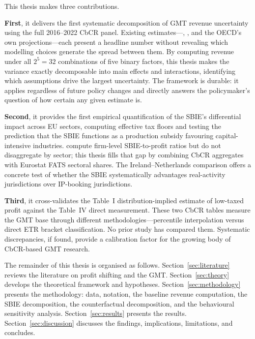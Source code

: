 \documentclass[11pt,a4paper]{article}
\begin{document}
This thesis makes three contributions.

\textbf{First}, it delivers the first systematic decomposition of GMT revenue uncertainty using the full 2016--2022 CbCR panel. Existing estimates---\citet{barake2022}, \citet{hugger2026}, and the OECD's own projections---each present a headline number without revealing which modelling choices generate the spread between them. By computing revenue under all $2^5 = 32$ combinations of five binary factors, this thesis makes the variance exactly decomposable into main effects and interactions, identifying which assumptions drive the largest uncertainty. The framework is durable: it applies regardless of future policy changes and directly answers the policymaker's question of how certain any given estimate is.

\textbf{Second}, it provides the first empirical quantification of the SBIE's differential impact across EU sectors, computing effective tax floors and testing the \citet{schjelderup2024} prediction that the SBIE functions as a production subsidy favouring capital-intensive industries. \citet{devereux2023} compute firm-level SBIE-to-profit ratios but do not disaggregate by sector; this thesis fills that gap by combining CbCR aggregates with Eurostat FATS sectoral shares. The Ireland--Netherlands comparison offers a concrete test of whether the SBIE systematically advantages real-activity jurisdictions over IP-booking jurisdictions.

\textbf{Third}, it cross-validates the Table~I distribution-implied estimate of low-taxed profit against the Table~IV direct measurement. These two CbCR tables measure the GMT base through different methodologies---percentile interpolation versus direct ETR bracket classification. No prior study has compared them. Systematic discrepancies, if found, provide a calibration factor for the growing body of CbCR-based GMT research.

The remainder of this thesis is organised as follows. Section~\ref{sec:literature} reviews the literature on profit shifting and the GMT. Section~\ref{sec:theory} develops the theoretical framework and hypotheses. Section~\ref{sec:methodology} presents the methodology: data, notation, the baseline revenue computation, the SBIE decomposition, the counterfactual decomposition, and the behavioural sensitivity analysis. Section~\ref{sec:results} presents the results. Section~\ref{sec:discussion} discusses the findings, implications, limitations, and concludes.

\newpage
\end{document}
